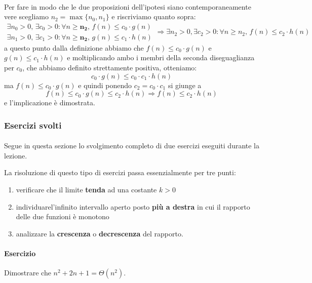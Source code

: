 \documentclass[11pt,a4paper,oneside]{article}
\begin{document}
\paragraph*{}Per fare in modo che le due proposizioni dell'ipotesi siano contemporaneamente vere scegliamo $n_2 = \max\{n_0, n_1\}$ e riscriviamo quanto sopra:
\[
\begin{array}{l}
\exists n_0 > 0,\, \exists c_0 > 0: \forall n \geq \bm{n_2},\,f(n) \leq c_0\cdot g(n) \\
\exists n_1 > 0,\, \exists c_1 > 0: \forall n \geq \bm{n_2},\,g(n) \leq c_1\cdot h(n) 
\end{array} \Rightarrow \exists n_2 > 0, \exists c_2 > 0 : \forall n \geq n_2,\,f(n) \leq c_2\cdot h(n)
\]
a questo punto dalla definizione abbiamo che $f(n) \leq c_0\cdot g(n)$ e $g(n) \leq c_1\cdot h(n)$ e moltiplicando ambo i membri della seconda diseguaglianza per $c_0$, che abbiamo definito strettamente positiva, otteniamo: $$c_0\cdot g(n) \leq c_0 \cdot c_1 \cdot h(n)$$ ma $f(n) \leq c_0\cdot g(n)$ e quindi ponendo $c_2 = c_0 \cdot c_1$ si giunge a $$f(n) \leq c_0\cdot g(n)\leq c_2 \cdot h(n) \Rightarrow f(n) \leq c_2\cdot h(n)$$ e l'implicazione è dimostrata.
\pagebreak
\subsubsection{Esercizi svolti}
\paragraph*{} Segue in questa sezione lo svolgimento completo di due esercizi eseguiti durante la lezione. 

\begin{tcolorbox}[title=Ricorda che...]
	\label{tbox:solving}
	La risoluzione di questo tipo di esercizi passa essenzialmente per tre punti:
	\begin{enumerate}
		\item verificare che il limite \textbf{tenda} ad una costante $k > 0$
		\item individuarel'infinito intervallo aperto posto \textbf{più a destra} in cui il rapporto delle due funzioni è monotono
		\item analizzare la \textbf{crescenza} o \textbf{decrescenza} del rapporto.
	\end{enumerate}
\end{tcolorbox}


\paragraph*{Esercizio} Dimostrare che $n^2+2n+1 = \Theta(n^2)$.
\end{document}
